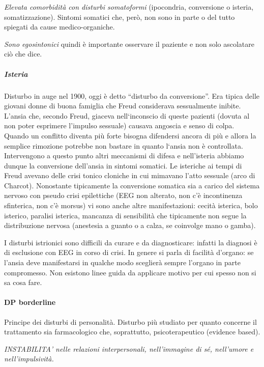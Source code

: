 \emph{Elevata comorbidità con disturbi somatoformi} (ipocondria,
conversione o isteria, somatizzazione). Sintomi somatici che, però, non
sono in parte o del tutto spiegati da cause medico-organiche.

\emph{Sono egosintonici} quindi è importante osservare il paziente e non
solo ascolatare ciò che dice.

\subparagraph{Isteria}

Disturbo in auge nel 1900, oggi è detto ``disturbo da conversione''. Era
tipica delle giovani donne di buona famiglia che Freud considerava
sessualmente inibite. L'ansia che, secondo Freud, giaceva nell`inconscio
di queste pazienti (dovuta al non poter esprimere l'impulso sessuale)
causava angoscia e senso di colpa. Quando un conflitto diventa più forte
bisogna difendersi ancora di più e allora la semplice rimozione potrebbe
non bastare in quanto l`ansia non è controllata. Intervengono a questo
punto altri meccanismi di difesa e nell'isteria abbiamo dunque la
conversione dell'ansia in sintomi somatici. Le isteriche ai tempi di
Freud avevano delle crisi tonico cloniche in cui mimavano l'atto
sessuale (arco di Charcot). Nonostante tipicamente la conversione
somatica sia a carico del sistema nervoso con pseudo crisi epilettiche
(EEG non alterato, non c'è incontinenza sfinterica, non c'è morsus) vi
sono anche altre manifestazioni: cecità isterica, bolo isterico,
paralisi isterica, mancanza di sensibilità che tipicamente non segue la
distribuzione nervosa (anestesia a guanto o a calza, se coinvolge mano o
gamba).

I disturbi istrionici sono difficili da curare e da diagnosticare:
infatti la diagnosi è di esclusione con EEG in corso di crisi. In genere
si parla di facilità d'organo: se l'ansia deve manifestarsi in qualche
modo sceglierà sempre l'organo in parte compromesso. Non esistono linee
guida da applicare motivo per cui spesso non si sa cosa fare.

\paragraph{DP borderline}

Principe dei disturbi di personalità. Disturbo più studiato per quanto
concerne il trattamento sia farmacologico che, soprattutto,
psicoterapeutico (evidence based).

\emph{INSTABILITA' nelle relazioni interpersonali, nell'immagine di sé,
nell'umore e nell'impulsività.}

